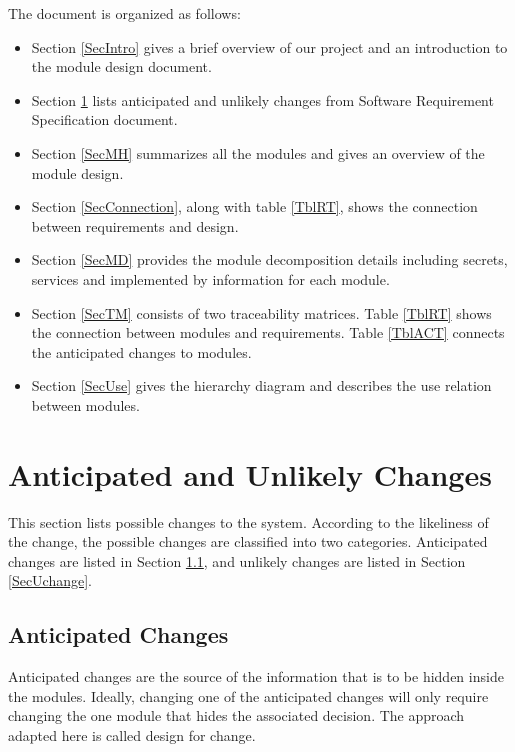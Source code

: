 \documentclass[12pt, titlepage]{article}
\begin{document}
The document is organized as follows:
\begin{itemize}
\item Section \ref{SecIntro} gives a brief overview of our project and an introduction to the module design document.
\item Section \ref{SecChange} lists anticipated and unlikely changes from Software Requirement Specification document.
\item Section \ref{SecMH} summarizes all the modules and gives an overview of the module design.
\item Section \ref{SecConnection}, along with table \ref{TblRT}, shows the connection between requirements and design.
\item Section \ref{SecMD} provides the module decomposition details including secrets, services and implemented by information for each module.
\item Section \ref{SecTM} consists of two traceability matrices. Table \ref{TblRT} shows the connection between modules and requirements. Table \ref{TblACT} connects the anticipated changes to modules.
\item Section \ref{SecUse} gives the hierarchy diagram and describes the use relation between modules.
\end{itemize}

\section{Anticipated and Unlikely Changes} \label{SecChange}

This section lists possible changes to the system. According to the likeliness
of the change, the possible changes are classified into two
categories. Anticipated changes are listed in Section \ref{SecAchange}, and
unlikely changes are listed in Section \ref{SecUchange}.

\subsection{Anticipated Changes} \label{SecAchange}

Anticipated changes are the source of the information that is to be hidden
inside the modules. Ideally, changing one of the anticipated changes will only
require changing the one module that hides the associated decision. The approach
adapted here is called design for
change.
\end{document}
